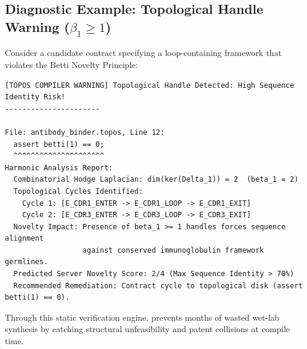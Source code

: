 \subsection{Diagnostic Example: Topological Handle Warning (\texorpdfstring{$\beta_1 \ge 1$}{beta_1 >= 1})}
Consider a candidate contract specifying a loop-containing framework that violates the Betti Novelty Principle:
\begin{lstlisting}[language={}]
[TOPOS COMPILER WARNING] Topological Handle Detected: High Sequence Identity Risk!
----------------------

File: antibody_binder.topos, Line 12:
  assert betti(1) == 0;
  ^^^^^^^^^^^^^^^^^^^^^
Harmonic Analysis Report:
  Combinatorial Hodge Laplacian: dim(ker(Delta_1)) = 2  (beta_1 = 2)
  Topological Cycles Identified: 
    Cycle 1: [E_CDR1_ENTER -> E_CDR1_LOOP -> E_CDR1_EXIT]
    Cycle 2: [E_CDR3_ENTER -> E_CDR3_LOOP -> E_CDR3_EXIT]
  Novelty Impact: Presence of beta_1 >= 1 handles forces sequence alignment 
                  against conserved immunoglobulin framework germlines.
  Predicted Server Novelty Score: 2/4 (Max Sequence Identity > 70%)
  Recommended Remediation: Contract cycle to topological disk (assert betti(1) == 0).
\end{lstlisting}

Through this static verification engine, \ToposLang{} prevents months of wasted wet-lab synthesis by catching structural unfeasibility and patent collisions at compile time.
